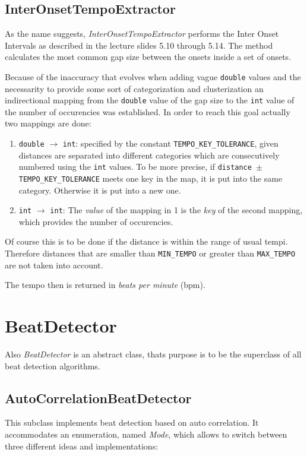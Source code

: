\subsection{\ttfamily InterOnsetTempoExtractor}
As the name suggests, \emph{InterOnsetTempoExtractor} performs the Inter Onset
Intervals as described in the lecture slides 5.10 through 5.14. The method
calculates the most common gap size between the onsets inside a set of onsets. 

Because of the inaccuracy that evolves when adding vague \texttt{double}
values and the necessarity to provide some sort of categorization and
clusterization an indirectional mapping from the \texttt{double} value of the
gap size to the \texttt{int} value of the number of occurencies was established.
In order to reach this goal actually two mappings are done:

\begin{enumerate}
  \item \texttt{double} $\rightarrow$ \texttt{int}: specified by the constant
  \texttt{TEMPO\_KEY\_TOLERANCE}, given distances are separated into different
  categories which are consecutively numbered using the \texttt{int} values. To
  be more precise, if \texttt{distance $\pm$ TEMPO\_KEY\_TOLERANCE}
  meets one key in the map, it is put into the same category. Otherwise it is
  put into a new one.
  \item \texttt{int} $\rightarrow$ \texttt{int}: The \emph{value} of the
  mapping in 1 is the \emph{key} of the second mapping, which provides the
  number of occurencies.
\end{enumerate}

Of course this is to be done if the distance is within the range of usual tempi.
Therefore distances that are smaller than \texttt{MIN\_TEMPO} or greater than
\texttt{MAX\_TEMPO} are not taken into account.

The tempo then is returned in \emph{beats per minute} (bpm).

\section{\ttfamily BeatDetector}
Also \emph{BeatDetector} is an abstract class, thats purpose is to be the
superclass of all beat detection algorithms. 

\subsection{\ttfamily AutoCorrelationBeatDetector}
This subclass implements beat detection based on auto correlation. It
accommodates an enumeration, named \emph{Mode}, which allows to switch between
three different ideas and implementations:

